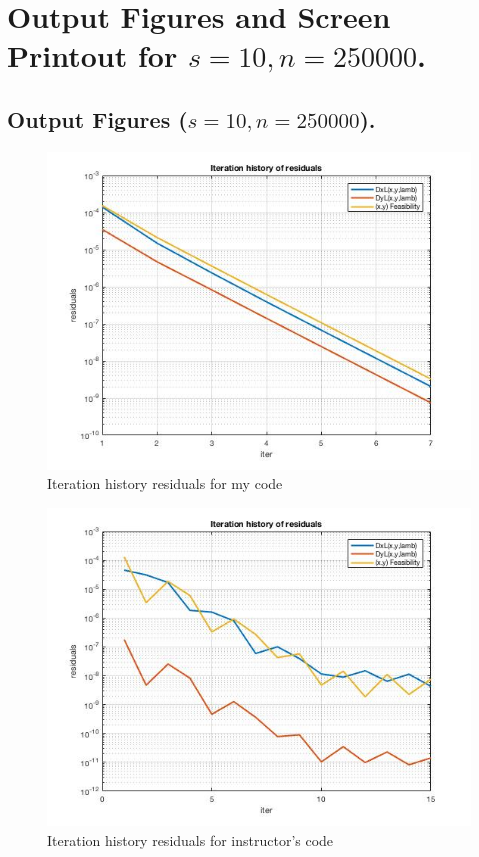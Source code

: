 \clearpage
\section{Output Figures and Screen Printout for $s=10,n=250000$.}
\subsection{Output Figures ($s=10,n=250000$).}
\begin{figure}[H]
\centering
\includegraphics[width=12cm]{F_12/F_1_2.jpg}
\caption{Iteration history residuals for my code}
\end{figure}
\begin{figure}[H]
\centering
\includegraphics[width=12cm]{F_12/F_1_3.jpg}
\caption{Iteration history residuals for instructor's code}
\end{figure}

